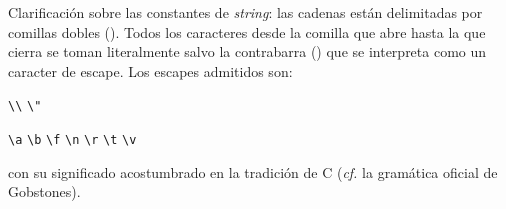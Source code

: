 \documentclass{article}
\begin{document}
Clarificaci\'on sobre las constantes de {\em string}:
las cadenas est\'an delimitadas por comillas dobles ().
Todos los caracteres desde la comilla que abre hasta la que cierra se
toman literalmente salvo la contrabarra (\chr{\textbackslash}) que se
interpreta como un caracter de escape.
Los escapes admitidos son:
\begin{center}
\texttt{\textbackslash\textbackslash}
\hspace{1cm}
\texttt{\textbackslash"}
\end{center}
\begin{center}
\texttt{\textbackslash{a}}
\hspace{1cm}
\texttt{\textbackslash{b}}
\hspace{1cm}
\texttt{\textbackslash{f}}
\hspace{1cm}
\texttt{\textbackslash{n}}
\hspace{1cm}
\texttt{\textbackslash{r}}
\hspace{1cm}
\texttt{\textbackslash{t}}
\hspace{1cm}
\texttt{\textbackslash{v}}
\end{center}
con su significado acostumbrado en la tradici\'on de C
({\em cf.} la gram\'atica oficial de Gobstones).
\bigskip
\end{document}
